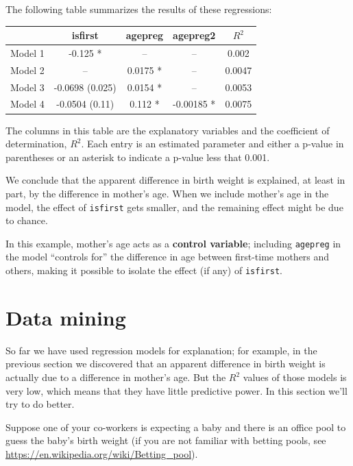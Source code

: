 \documentclass[12pt]{book}
\begin{document}
The following table summarizes the results of these regressions:

\begin{center}
\begin{tabular}{|l|c|c|c|c|}
\hline & isfirst & agepreg & agepreg2 & $R^2$ \\ \hline
Model 1 & -0.125 * & -- & -- & 0.002 \\
Model 2 & -- & 0.0175 * & -- & 0.0047 \\
Model 3 & -0.0698 (0.025) & 0.0154 * & -- & 0.0053 \\
Model 4 & -0.0504 (0.11) & 0.112 * & -0.00185 * & 0.0075 \\
\hline
\end{tabular}
\end{center}

The columns in this table are the explanatory variables and
the coefficient of determination, $R^2$.  Each entry is an estimated
parameter and either a p-value in parentheses or an asterisk to
indicate a p-value less that 0.001.

We conclude that the apparent difference in birth weight
is explained, at least in part, by the difference in mother's age.
When we include mother's age in the model, the effect of
\verb"isfirst" gets smaller, and the remaining effect might be
due to chance.

In this example, mother's age acts as a {\bf control variable};
including \verb"agepreg" in the model ``controls for'' the
difference in age between first-time mothers and others, making
it possible to isolate the effect (if any) of \verb"isfirst". 


\section{Data mining}
\label{mining}

So far we have used regression models for explanation; for example,
in the previous section we discovered that an apparent difference
in birth weight is actually due to a difference in mother's age.
But the $R^2$ values of those models is very low, which means that
they have little predictive power.  In this section we'll try to
do better.

Suppose one of your co-workers is expecting a baby and
there is an office pool to guess the baby's birth weight (if you are
not familiar with betting pools, see
\url{https://en.wikipedia.org/wiki/Betting_pool}).
\end{document}
